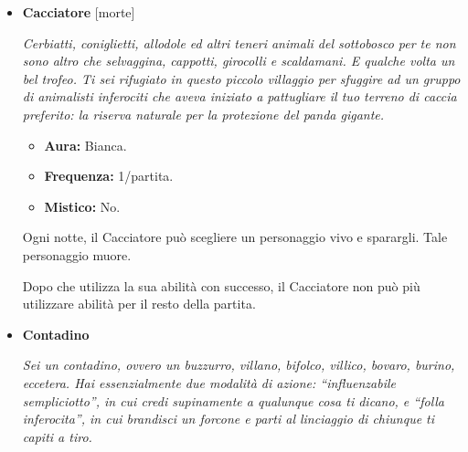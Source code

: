 \documentclass[a4paper,10pt]{article}
\begin{document}
\begin{itemize}
            \emph{TODO.}

            \begin{multicols}{3}
                  \begin{itemize}
                        \item \textbf{Aura:} Nera.
                        \item \textbf{Frequenza:} 1/2 notti.
                        \item \textbf{Mistico:} No.
                  \end{itemize}
            \end{multicols}

            Ogni due notti, il Bracconiere può scegliere un personaggio vivo e piazzare una trappola davanti alla sua casa. Per quella notte, se un Lupo utilizza la propria abilità su tale personaggio, il Lupo muore.

      \item \textbf{Cacciatore} [morte]

            \emph{Cerbiatti, coniglietti, allodole ed altri teneri animali del sottobosco per te non sono altro che selvaggina, cappotti, girocolli e scaldamani. E qualche volta un bel trofeo. Ti sei rifugiato in questo piccolo villaggio per sfuggire ad un gruppo di animalisti inferociti che aveva iniziato a pattugliare il tuo terreno di caccia preferito: la riserva naturale per la protezione del panda gigante.}

            \begin{multicols}{3}
                  \begin{itemize}
                        \item \textbf{Aura:} Bianca.
                        \item \textbf{Frequenza:} 1/partita.
                        \item \textbf{Mistico:} No.
                  \end{itemize}
            \end{multicols}

            Ogni notte, il Cacciatore può scegliere un personaggio vivo e sparargli. Tale personaggio muore.

            Dopo che utilizza la sua abilità con successo, il Cacciatore non può più utilizzare abilità per il resto della partita.

      \item \textbf{Contadino}

            \emph{Sei un contadino, ovvero un buzzurro, villano, bifolco, villico, bovaro, burino, eccetera. Hai essenzialmente due modalità di azione: ``influenzabile sempliciotto'', in cui credi supinamente a qualunque cosa ti dicano, e ``folla inferocita'', in cui brandisci un forcone e parti al linciaggio di chiunque ti capiti a tiro.}


\end{itemize}
\end{document}
